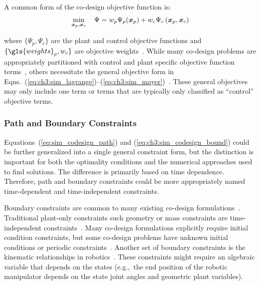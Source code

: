 A common form of the co-design objective function is:
\begin{align} \label{eq:ch3:sep_objs}
\min_{\bm{x}_p, \bm{x}_c} \quad \Psi = w_p \Psi_p ( \bm{x}_p ) + w_c \Psi_c\left( \bm{x}_p, \bm{x}_c \right)
\end{align}

\noindent where $\{\Psi_p, \Psi_c\}$ are the plant and control objective functions and $\{\gls{weights}_p, w_c\}$ are objective weights~\cite{Fathy2001a}. 
While many co-design problems are appropriately partitioned with control and plant specific objective function terms~\cite{Frischknecht2011a, Fathy2003a, Hale1985a, Peters2009a, Peters2011a, Rao1988a, Reyer2001a, Sunar1993a}, others necessitate the general objective form in Eqns.~(\ref{eq:ch3:sim_lagrange})--(\ref{eq:ch3:sim_mayer})~\cite{Allison2013d, Deshmukh2016a, Fathy2003a, Herber2013a, Chilan2017a}. 
These general objectives may only include one term or terms that are typically only classified as ``control'' objective terms.

\subsubsection{Path and Boundary Constraints}%
Equations~(\ref{eq:sim_codesign_path}) and (\ref{eq:ch3:sim_codesign_bound}) could be further generalized into a single general constraint form, but the distinction is important for both the optimality conditions and the numerical approaches used to find solutions.
The difference is primarily based on time dependence. Therefore, path and boundary constraints could be more appropriately named time-dependent and time-independent constraints.

Boundary constraints are common to many existing co-design formulations~\cite{Fathy2001a, Allison2014a, Herber2014a}.
Traditional plant-only constraints such geometry or mass constraints are time-independent constraints~\cite{Peters2009a, Peters2011a, Allison2014b, Rao1988a}.
Many co-design formulations explicitly require initial condition constraints, but some co-design problems have unknown initial conditions or periodic constraints~\cite{Herber2013a}.
Another set of boundary constraints is the kinematic relationships in
robotics~\cite{Spong2005a}. These constraints might require an algebraic variable that depends on the states (e.g.,~the end position of the robotic manipulator depends on the state joint angles and geometric plant variables). 

